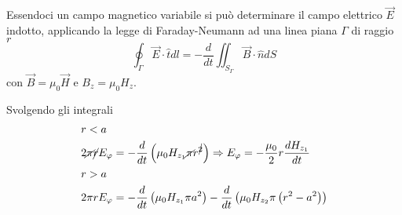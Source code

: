 Essendoci un campo magnetico variabile si può determinare il campo elettrico $\vec{E}$ 
indotto, applicando la legge di Faraday-Neumann ad una linea piana $\Gamma$ di raggio $r$
$$
\oint_\Gamma \vec{E}\cdot\hat{t} dl = -\frac{d}{dt} \iint_{S_\Gamma} \vec{B}\cdot\hat{n}dS
$$
con $\vec{B} = \mu_0 \vec{H}$ e $B_z = \mu_0 H_z$.

Svolgendo gli integrali
$$
\begin{aligned}
&r< a \\
& 2 \cancel{\pi} \cancel{r} E_\varphi = -\frac{d}{dt} \left(\mu_0 H_{z_1}\cancel{\pi} r^{\cancel{2}}\right) \Rightarrow E_\varphi = -\frac{\mu_0}{2}r \frac{dH_{z_1}}{dt}\\
& r >  a \\
& 2\pi r E_\varphi = -\frac{d}{dt} \left(\mu_0 H_{z_1} \pi a^2\right) - \frac{d}{dt} \left(\mu_0 H_{z_2} \pi \left(r^2 - a^2\right)\right)
\end{aligned}
$$

